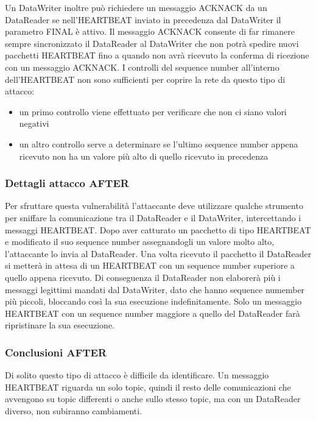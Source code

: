 Un DataWriter inoltre può richiedere un messaggio ACKNACK da un DataReader se
nell'HEARTBEAT inviato in precedenza dal DataWriter il parametro FINAL è attivo.
Il messaggio ACKNACK consente di far rimanere sempre sincronizzato il DataReader al 
DataWriter che non potrà spedire nuovi pacchetti HEARTBEAT fino a quando non avrà 
ricevuto la conferma di ricezione con un messaggio ACKNACK.
I controlli del sequence number all'interno dell'HEARTBEAT 
non sono sufficienti per coprire la rete da questo tipo di attacco:
\begin{itemize}
    \item un primo controllo viene effettuato per verificare che non ci siano 
    valori negativi
    \item un altro controllo serve a determinare se l'ultimo sequence number 
    appena ricevuto non ha un valore più alto di quello ricevuto in precedenza
\end{itemize}
\subsubsection{Dettagli attacco AFTER}

Per sfruttare questa vulnerabilità l'attaccante deve utilizzare qualche 
strumento per sniffare la comunicazione tra il DataReader e il DataWriter,
intercettando i
messaggi HEARTBEAT. Dopo aver catturato un pacchetto di tipo HEARTBEAT e modificato 
il suo sequence number assegnandogli un valore molto alto, 
l'attaccante lo invia al DataReader.
Una volta ricevuto il pacchetto il DataReader si metterà in attesa di un HEARTBEAT 
con un
sequence number superiore a quello appena ricevuto. Di conseguenza il DataReader
non elaborerà più i messaggi legittimi mandati dal DataWriter,
dato che hanno sequence numember più piccoli, bloccando così la sua
esecuzione indefinitamente. Solo un messaggio HEARTBEAT con un sequence number
maggiore a quello del DataReader farà ripristinare la sua esecuzione.


\subsubsection{Conclusioni AFTER}
Di solito questo tipo di attacco è difficile da identificare. 
Un messaggio HEARTBEAT riguarda un solo topic, quindi il resto delle
comunicazioni che avvengono su topic differenti o anche sullo stesso 
topic, ma con un DataReader diverso, non subiranno cambiamenti.


